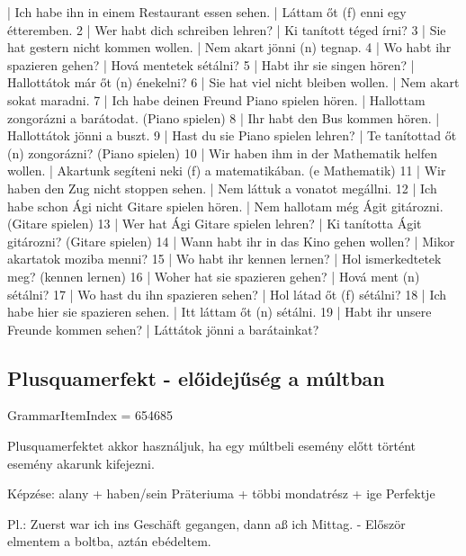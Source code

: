 \documentclass{article}
\newenvironment{desc}{\verbatim}{\endverbatim}
\newenvironment{exmp}{\verbatim}{\endverbatim}
\begin{document}
\begin{exmp}
1 | Ich habe ihn in einem Restaurant essen sehen. | Láttam őt (f) enni egy étteremben.
2 | Wer habt dich schreiben lehren? | Ki tanított téged írni?
3 | Sie hat gestern nicht kommen wollen. | Nem akart jönni (n) tegnap.
4 | Wo habt ihr spazieren gehen? | Hová mentetek sétálni? 
5 | Habt ihr sie singen hören? | Hallottátok már őt (n) énekelni?
6 | Sie hat viel nicht bleiben wollen. | Nem akart sokat maradni.
7 | Ich habe deinen Freund Piano spielen hören. | Hallottam zongorázni a barátodat. (Piano spielen)
8 | Ihr habt den Bus kommen hören. | Hallottátok jönni a buszt.
9 | Hast du sie Piano spielen lehren? | Te tanítottad őt (n) zongorázni? (Piano spielen)
10 | Wir haben ihm in der Mathematik helfen wollen. | Akartunk segíteni neki (f) a matematikában. (e Mathematik)
11 | Wir haben den Zug nicht stoppen sehen. | Nem láttuk a vonatot megállni.
12 | Ich habe schon Ági nicht Gitare spielen hören. | Nem hallotam még Ágit gitározni. (Gitare spielen)
13 | Wer hat Ági Gitare spielen lehren? | Ki tanította Ágit gitározni? (Gitare spielen)
14 | Wann habt ihr in das Kino gehen wollen? | Mikor akartatok moziba menni?
15 | Wo habt ihr kennen lernen? | Hol ismerkedtetek meg? (kennen lernen)
16 | Woher hat sie spazieren gehen? | Hová ment (n) sétálni?
17 | Wo hast du ihn spazieren sehen? | Hol látad őt (f) sétálni?
18 | Ich habe hier sie spazieren sehen. | Itt láttam őt (n) sétálni.
19 | Habt ihr unsere Freunde kommen sehen? | Láttátok jönni a barátainkat?
\end{exmp}

\subsection{Plusquamerfekt - előidejűség a múltban}

GrammarItemIndex = 654685

\begin{desc}
Plusquamerfektet akkor használjuk, ha egy múltbeli esemény előtt történt esemény akarunk kifejezni.

Képzése:
alany + haben/sein Präteriuma + többi mondatrész + ige Perfektje

Pl.: Zuerst war ich ins Geschäft gegangen, dann aß ich Mittag. - Először elmentem a boltba, aztán ebédeltem.
\end{desc}
\end{document}
